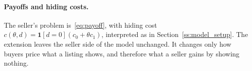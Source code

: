 \paragraph{Payoffs and hiding costs.}
The seller's problem is~\eqref{eq:payoff}, with hiding cost $c(\theta,d)=\mathbf 1[d=0](c_0+\theta c_1)$, interpreted as in Section~\ref{ss:model_setup}. The extension leaves the seller side of the model unchanged. It changes only how buyers price what a listing shows, and therefore what a seller gains by showing nothing.
